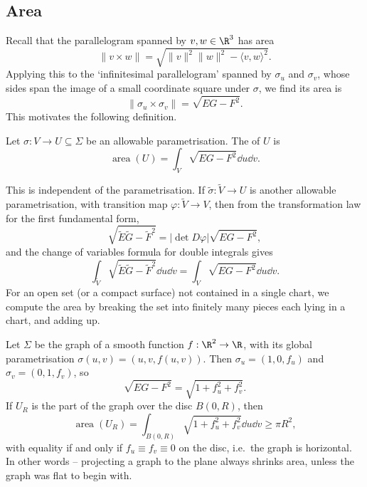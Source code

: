 \subsection{Area}

Recall that the parallelogram spanned by $v, w \in \R^3$ has area
$$
\|v \times w\| = \sqrt{\|v\|^2\|w\|^2 - \langle v, w\rangle^2}.
$$
Applying this to the `infinitesimal parallelogram' spanned by $\sigma_u$ and $\sigma_v$, whose sides span the image of a small coordinate square under $\sigma$, we find its area is
$$
\|\sigma_u \times \sigma_v\| = \sqrt{EG - F^2}.
$$
This motivates the following definition.

\begin{definition}[Area]
    Let $\sigma: V \rightarrow U \subseteq \Sigma$ be an allowable parametrisation. The  of $U$ is
    $$
    \operatorname{area}(U) = \int_V \sqrt{EG - F^2} \dd u \dd v.
    $$
\end{definition}

\begin{remark}
    This is independent of the parametrisation. If $\tilde{\sigma}: \tilde{V} \rightarrow U$ is another allowable parametrisation, with transition map $\varphi: \tilde V \rightarrow V$, then from the transformation law for the first fundamental form,
    $$
    \sqrt{\tilde E \tilde G - \tilde F^2} = |{\det D\varphi}| \sqrt{EG - F^2},
    $$
    and the change of variables formula for double integrals gives
    $$
    \int_{\tilde V} \sqrt{\tilde E \tilde G - \tilde F^2} \dd u \dd v = \int_V \sqrt{EG - F^2} \dd u \dd v.
    $$
    For an open set (or a compact surface) not contained in a single chart, we compute the area by breaking the set into finitely many pieces each lying in a chart, and adding up.
\end{remark}

\begin{example}
    Let $\Sigma$ be the graph of a smooth function $f: \R^2 \rightarrow \R$, with its global parametrisation $\sigma(u, v) = (u, v, f(u, v))$. Then $\sigma_u = (1, 0, f_u)$ and $\sigma_v = (0, 1, f_v)$, so
    $$
    \sqrt{EG - F^2} = \sqrt{1 + f_u^2 + f_v^2}.
    $$
    If $U_R$ is the part of the graph over the disc $B(0, R)$, then
    $$
    \operatorname{area}(U_R) = \int_{B(0, R)} \sqrt{1 + f_u^2 + f_v^2} \dd u \dd v \geq \pi R^2,
    $$
    with equality if and only if $f_u \equiv f_v \equiv 0$ on the disc, i.e.\ the graph is horizontal. In other words -- projecting a graph to the plane always shrinks area, unless the graph was flat to begin with.
\end{example}

